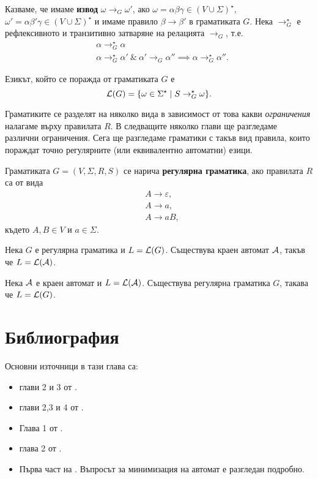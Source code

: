 Казваме, че имаме {\bf извод} $\omega \to_G \omega'$, ако $\omega = \alpha\beta\gamma \in (V\cup\Sigma)^\star$,
$\omega' = \alpha\beta'\gamma \in (V\cup\Sigma)^\star$ и имаме правило $\beta \to \beta'$ в граматиката $G$.
Нека $\to^\star_G$ е рефлексивното и транзитивно затваряне на релацията $\to_G$, т.е.
\begin{align*}
  & \alpha \to^\star_G \alpha\\
  & \alpha \to^\star_G \alpha'\ \&\ \alpha' \to_G \alpha'' \implies \alpha \to^\star_G \alpha''.
\end{align*}

Езикът, който се поражда от граматиката $G$ е
\[\mathcal{L}(G) = \{\omega \in \Sigma^\star \mid S \to^\star_G \omega\}.\]

Граматиките се разделят на няколко вида в зависимост от това какви {\em ограничения} налагаме върху правилата $R$.
В следващите няколко глави ще разгледаме различни ограничения. Сега ще разгледаме граматики с такъв вид правила,
които пораждат точно регулярните (или еквивалентно автоматни) езици.

Граматиката $G = (V, \Sigma, R, S)$ се нарича {\bf регулярна граматика},
ако правилата $R$ са от вида 
\begin{align*}
  & A \to \varepsilon,\\
  & A \to a,\\
  & A \to aB,
\end{align*}
където $A, B \in V$ и $a \in \Sigma$.

\begin{prop}
  Нека $G$ е регулярна граматика и $L = \mathcal{L}(G)$.
  Съществува краен автомат $\mathcal{A}$, такъв че $L = \mathcal{L}(\mathcal{A})$.
\end{prop}

\begin{prop}
  Нека $\mathcal{A}$ е краен автомат и $L = \mathcal{L}(\mathcal{A})$.
  Съществува регулярна граматика $G$, такава че $L = \mathcal{L}(G)$.
\end{prop}




\section*{Библиография}

Основни източници в тази глава са:
\begin{itemize}
\item 
  глави 2 и 3 от \cite{hopcroft1}.
\item
  глави 2,3 и 4 от \cite{hopcroft2}.
\item
  Глава 1 от \cite{sipser1}.
\item
  глава 2 от \cite{papadimitriou}.
\item
  Първа част на \cite{kozen}. Въпросът за минимизация на автомат е разгледан подробно.
\end{itemize}


